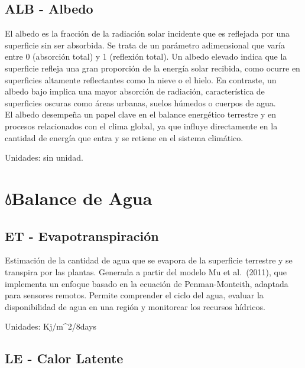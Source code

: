 \documentclass[
]{book}
\begin{document}
\subsection{\texorpdfstring{\textbf{ALB} - Albedo}{ALB - Albedo}}\label{alb---albedo}

El albedo es la fracción de la radiación solar incidente que es reflejada por una superficie sin ser absorbida. Se trata de un parámetro adimensional que varía entre 0 (absorción total) y 1 (reflexión total). Un albedo elevado indica que la superficie refleja una gran proporción de la energía solar recibida, como ocurre en superficies altamente reflectantes como la nieve o el hielo. En contraste, un albedo bajo implica una mayor absorción de radiación, característica de superficies oscuras como áreas urbanas, suelos húmedos o cuerpos de agua.\\
El albedo desempeña un papel clave en el balance energético terrestre y en procesos relacionados con el clima global, ya que influye directamente en la cantidad de energía que entra y se retiene en el sistema climático.

Unidades: sin unidad.

\section{\texorpdfstring{\textbf{💧Balance de Agua}}{💧Balance de Agua}}\label{balance-de-agua}

\subsection{\texorpdfstring{\textbf{ET} - Evapotranspiración}{ET - Evapotranspiración}}\label{et---evapotranspiraciuxf3n}

Estimación de la cantidad de agua que se evapora de la superficie terrestre y se transpira por las plantas. Generada a partir del modelo Mu et al.~(2011), que implementa un enfoque basado en la ecuación de Penman-Monteith, adaptada para sensores remotos. Permite comprender el ciclo del agua, evaluar la disponibilidad de agua en una región y monitorear los recursos hídricos.

Unidades: Kj/m\^{}2/8days

\subsection{\texorpdfstring{\textbf{LE} - Calor Latente}{LE - Calor Latente}}\label{le---calor-latente}
\end{document}
